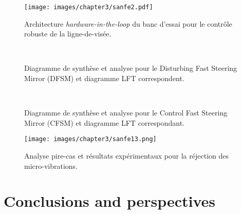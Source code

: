 \begin{figure}[!th]
\centering
     \texttt{[image: images/chapter3/sanfe2.pdf]}
 \caption{Architecture \textit{hardware-in-the-loop} du banc d’essai pour le contrôle robuste de la ligne-de-visée.}
 \label{fig:bench_scheme_fr}
\end{figure}

\begin{figure*}[!ht]%
    \centering
    \\
    \caption{Diagramme de synthèse et analyse pour le Disturbing Fast Steering Mirror (DFSM) et diagramme LFT correspondent.}%
    \label{fig:control_scheme_DFSM_fr}%
\end{figure*}
\begin{figure*}[!ht]%
    \centering
    \\
    \caption{Diagramme de synthèse et analyse pour le Control Fast Steering Mirror (CFSM) et diagramme LFT correspondant.}%
    \label{fig:control_scheme_bench_fr}%
\end{figure*}

\begin{figure*}[!h]
    \centering
    \texttt{[image: images/chapter3/sanfe13.png]}
    \caption{Analyse pire-cas et résultats expérimentaux pour la réjection des micro-vibrations.}
    \label{fig:comparison_hybridization_fr}
\end{figure*}

\newpage
\section{Conclusions and perspectives}

